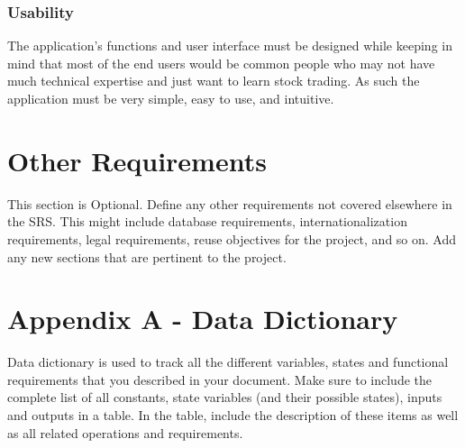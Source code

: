 \documentclass[12 pt, a4paper]{report}
\begin{document}
	\subsection{Usability}
	The application's functions and user interface must be designed while keeping in mind that most of the end users would be common people who may not have much technical expertise and just want to learn stock trading. As such the application must be very simple, easy to use, and intuitive.
		
	\chapter {Other Requirements}
	This section is Optional. Define any other requirements not covered elsewhere in the SRS. This might include database requirements, internationalization requirements, legal requirements, reuse objectives for the project, and so on. Add any new sections that are pertinent to the project.
		
	\chapter {Appendix A - Data Dictionary}
	Data dictionary is used to track all the different variables, states and functional requirements that you described in your document. Make sure to include the complete list of all constants, state variables (and their possible states), inputs and outputs in a table. In the table, include the description of these items as well as all related operations and requirements.
		
	
\end{document}
